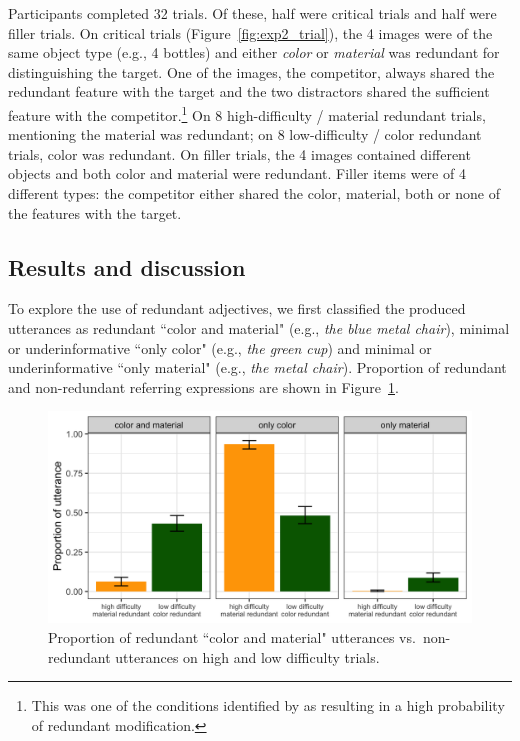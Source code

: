 \documentclass[12pt,letterpaper]{article}
\begin{document}
Participants completed 32 trials. Of these, half were critical trials and half were filler trials. On critical trials (Figure~\ref{fig:exp2_trial}), the 4 images were of the same object type (e.g., 4 bottles) and either \textit{color} or \textit{material} was redundant for distinguishing the target. One of the images, the competitor, always shared the redundant feature with the target and the two distractors shared the sufficient feature with the competitor.\footnote{This was one of the conditions identified by \citet{DegenEtAl2020} as resulting in a high probability of redundant modification.} On 8 high-difficulty / material redundant trials, mentioning the material was redundant; on 8 low-difficulty / color redundant trials, color was redundant. On filler trials, the 4 images contained different objects and both color and material were redundant. Filler items were of 4 different types: the competitor either shared the color, material, both or none of the features with the target. 

\subsection{Results and discussion}

To explore the use of redundant adjectives, we first classified the produced utterances as redundant ``color and material"  (e.g., \textit{the blue metal chair}), minimal or underinformative ``only color" (e.g., \textit{the green cup}) and minimal or underinformative ``only material" (e.g., \textit{the metal chair}). Proportion of redundant  and non-redundant referring expressions are shown in Figure~\ref{fig:exp2_proportion}. 

\begin{figure}[ht]
\centering
\includegraphics[width=.8\textwidth]{plots/exp2_proportion.png}
\caption{Proportion of redundant ``color and material" utterances vs.~non-redundant utterances on high and low difficulty trials.}
\label{fig:exp2_proportion}
\end{figure}
\end{document}
